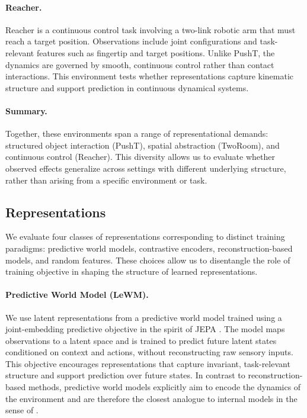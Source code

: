 \documentclass[10pt,twocolumn]{article}
\begin{document}
\paragraph{Reacher.}
Reacher is a continuous control task involving a two-link robotic arm that must reach a target position. Observations include joint configurations and task-relevant features such as fingertip and target positions. Unlike PushT, the dynamics are governed by smooth, continuous control rather than contact interactions. This environment tests whether representations capture kinematic structure and support prediction in continuous dynamical systems.

\paragraph{Summary.}
Together, these environments span a range of representational demands: structured object interaction (PushT), spatial abstraction (TwoRoom), and continuous control (Reacher). This diversity allows us to evaluate whether observed effects generalize across settings with different underlying structure, rather than arising from a specific environment or task.

\subsection{Representations}

We evaluate four classes of representations corresponding to distinct training paradigms: predictive world models, contrastive encoders, reconstruction-based models, and random features. These choices allow us to disentangle the role of training objective in shaping the structure of learned representations.

\paragraph{Predictive World Model (LeWM).}
We use latent representations from a predictive world model trained using a joint-embedding predictive objective in the spirit of JEPA \citep{lecun2023jepa}. The model maps observations to a latent space and is trained to predict future latent states conditioned on context and actions, without reconstructing raw sensory inputs. This objective encourages representations that capture invariant, task-relevant structure and support prediction over future states. In contrast to reconstruction-based methods, predictive world models explicitly aim to encode the dynamics of the environment and are therefore the closest analogue to internal models in the sense of \citet{craik1944nature}.
\end{document}
